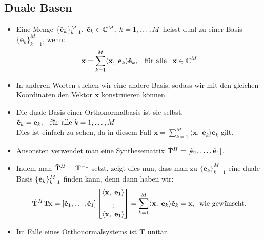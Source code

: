 \documentclass[11pt]{article}
\begin{document}
\subsection*{Duale Basen}
\vspace*{-0.5cm}
\begin{itemize}[leftmargin=0pt]
    \item[] Eine Menge $\{\Tilde{\mathbf{e}}_k\}_{k=1}^M, \; \Tilde{\mathbf{e}}_k \in \mathbb{C}^M, \; k = 1,\dots, M$ heisst dual zu einer Basis $\{\mathbf{e}_k\}_{k=1}^M$, wenn:
    $$\mathbf{x} = \sum_{k=1}^M \langle \mathbf{x}, \; \mathbf{e}_k \rangle \Tilde{\mathbf{e}}_k, \hspace{5pt} \text{ für alle } \hspace{5pt} \mathbf{x} \in \mathbb{C}^M$$
    \item[] In anderen Worten suchen wir eine andere Basis, sodass wir mit den gleichen Koordinaten den Vektor $\mathbf{x}$ konstruieren können.
    \item[] Die duale Basis einer Orthonormalbasis ist sie selbst. $\Tilde{\mathbf{e}}_k = \mathbf{e}_k, \hspace{5pt} \text{ für alle } k=1, \dots, M$\\
    Dies ist einfach zu sehen, da in diesem Fall $\mathbf{x} = \sum_{k=1}^M \langle \mathbf{x}, \; \mathbf{e}_k \rangle \mathbf{e}_k$ gilt.
    \item[] Ansonsten verwendet man eine Synthesematrix $\Tilde{\mathbf{T}}^H = \left[\Tilde{\mathbf{e}}_1, \dots,\Tilde{\mathbf{e}}_1 \right]$.
    \item[] Indem man $\Tilde{\mathbf{T}}^H = \mathbf{T}^{-1}$ setzt, zeigt dies nun, dass man zu $\{\mathbf{e}_k\}_{k=1}^M$ eine duale Basis $\{\Tilde{\mathbf{e}}_k\}_{k=1}^M$ finden kann, denn dann haben wir:
    $$\Tilde{\mathbf{T}}^H \mathbf{T} \mathbf{x} = \left[\Tilde{\mathbf{e}}_1, \dots,\Tilde{\mathbf{e}}_1 \right] \begin{bmatrix}
        \langle \mathbf{x}, \; \mathbf{e}_1 \rangle \\
        \vdots \\
        \langle \mathbf{x}, \; \mathbf{e}_1 \rangle
    \end{bmatrix} = \sum_{k=1}^M \langle \mathbf{x}, \; \mathbf{e}_k \rangle \Tilde{\mathbf{e}}_k = \mathbf{x}, \hspace{5pt} \text{wie gewünscht.}$$
    \item[] Im Falle eines Orthonormalsystems ist $\mathbf{T}$ unitär.
\end{itemize}
\end{document}
